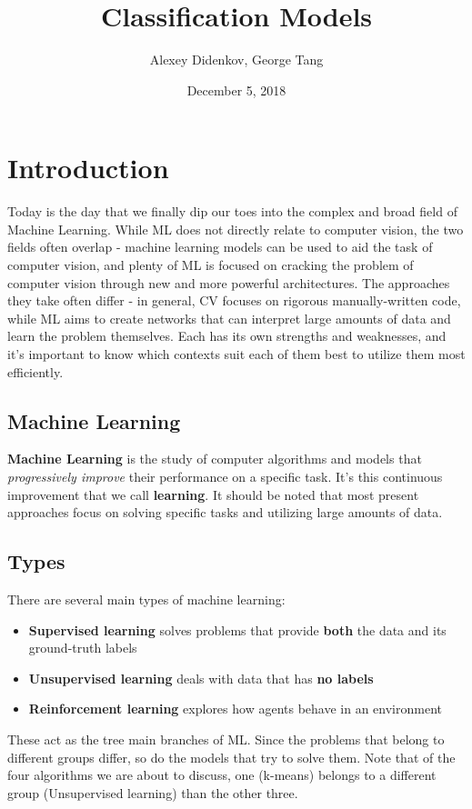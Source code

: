 \documentclass{article}
\title{Classification Models}
\author{Alexey Didenkov, George Tang}
\date{December 5, 2018}
\begin{document}
\maketitle

\section{Introduction}
Today is the day that we finally dip our toes into the complex and broad field of Machine Learning. While ML does not directly relate to computer vision, the two fields often overlap - machine learning models can be used to aid the task of computer vision, and plenty of ML is focused on cracking the problem of computer vision through new and more powerful architectures. The approaches they take often differ - in general, CV focuses on rigorous manually-written code, while ML aims to create networks that can interpret large amounts of data and learn the problem themselves. Each has its own strengths and weaknesses, and it's important to know which contexts suit each of them best to utilize them most efficiently.
\subsection{Machine Learning}
\textbf{Machine Learning} is the study of computer algorithms and models that \textit{progressively improve} their performance on a specific task. It's this continuous improvement that we call \textbf{learning}. It should be noted that most present approaches focus on solving specific tasks and utilizing large amounts of data.
\subsection{Types}
There are several main types of machine learning:
\begin{itemize}
    \item \textbf{Supervised learning} solves problems that provide \textbf{both} the data and its ground-truth labels
    \item \textbf{Unsupervised learning} deals with data that has \textbf{no labels}
    \item \textbf{Reinforcement learning} explores how agents behave in an environment
\end{itemize}
These act as the tree main branches of ML. Since the problems that belong to different groups differ, so do the models that try to solve them. Note that of the four algorithms we are about to discuss, one (k-means) belongs to a different group (Unsupervised learning) than the other three.
\end{document}
